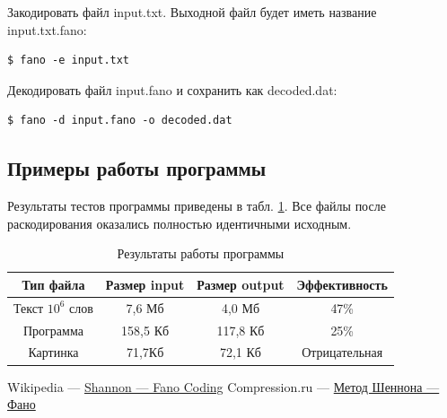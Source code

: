 \documentclass{article}
\begin{document}
Закодировать файл input.txt. Выходной файл будет иметь название input.txt.fano:

\begin{lstlisting}
$ fano -e input.txt
\end{lstlisting}

Декодировать файл input.fano и сохранить как decoded.dat:

\begin{lstlisting}
$ fano -d input.fano -o decoded.dat
\end{lstlisting}

\subsection{Примеры работы программы}

Результаты тестов программы приведены в табл. \ref{eff}.
Все файлы после раскодирования оказались полностью идентичными исходным.

\begin{table}
  \begin{center}
    \begin{tabular}{|c|c|c|c|}
    \hline
    Тип файла & Размер input & Размер output & Эффективность\\
    \hline
    Текст $10^{6}$ слов & 7,6 Мб & 4,0 Мб & 47\%\\
    \hline
    Программа & 158,5 Кб & 117,8 Кб & 25\%\\
    \hline
    Картинка & 71,7Кб & 72,1 Кб & Отрицательная\\
    \hline
    \end{tabular}
  \end{center}
  \caption{Результаты работы программы\label{eff}}
\end{table}


\newpage
\begin{thebibliography}{2}
  Wikipedia --- \href{https://en.wikipedia.org/wiki/Shannon%E2%80%93Fano_coding}{Shannon --- Fano Coding}
  Compression.ru --- \href{http://www.compression.ru/download/articles/huff/tiger_shannon-fano.html}{Метод Шеннона --- Фано}	

\end{thebibliography}
\end{document}
